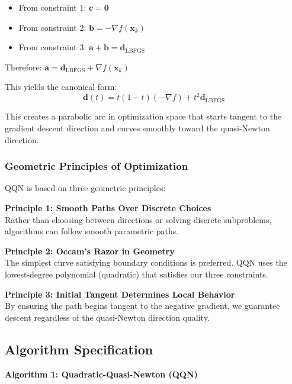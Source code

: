 \begin{itemize}
\tightlist
\item
  From constraint 1: \(\mathbf{c} = \mathbf{0}\)
\item
  From constraint 2: \(\mathbf{b} = -\nabla f(\mathbf{x}_k)\)
\item
  From constraint 3: \(\mathbf{a} + \mathbf{b} = \mathbf{d}_{\text{LBFGS}}\)
\end{itemize}

Therefore: \(\mathbf{a} = \mathbf{d}_{\text{LBFGS}} + \nabla f(\mathbf{x}_k)\)

This yields the canonical form:
\[\mathbf{d}(t) = t(1-t)(-\nabla f) + t^2 \mathbf{d}_{\text{LBFGS}}\]

This creates a parabolic arc in optimization space that starts tangent to the gradient descent direction and curves smoothly toward the quasi-Newton direction.

\hypertarget{geometric-principles-of-optimization}{%
\subsubsection{Geometric Principles of Optimization}\label{geometric-principles-of-optimization}}

QQN is based on three geometric principles:

\textbf{Principle 1: Smooth Paths Over Discrete Choices}\\
Rather than choosing between directions or solving discrete subproblems, algorithms can follow smooth parametric paths.

\textbf{Principle 2: Occam's Razor in Geometry}\\
The simplest curve satisfying boundary conditions is preferred. QQN uses the lowest-degree polynomial (quadratic) that satisfies our three constraints.

\textbf{Principle 3: Initial Tangent Determines Local Behavior}\\
By ensuring the path begins tangent to the negative gradient, we guarantee descent regardless of the quasi-Newton direction quality.

\hypertarget{algorithm-specification}{%
\subsection{Algorithm Specification}\label{algorithm-specification}}

\textbf{Algorithm 1: Quadratic-Quasi-Newton (QQN)}


